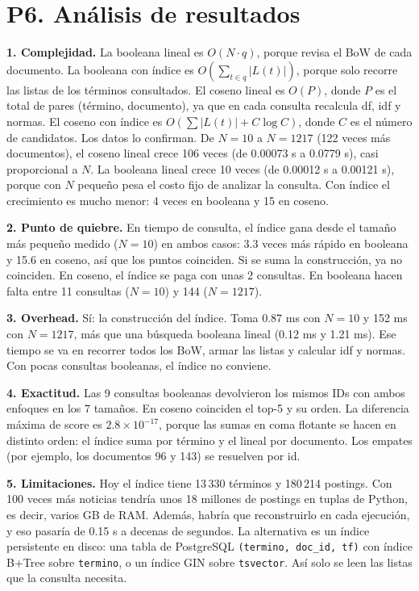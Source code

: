 \documentclass[11pt,a4paper]{article}
\newcommand{\code}[1]{\texttt{#1}}
\begin{document}
\section{P6. Análisis de resultados}
\textbf{1. Complejidad.} La booleana lineal es $O(N\cdot q)$, porque revisa el BoW de cada documento.
La booleana con índice es $O(\sum_{t\in q}|L(t)|)$, porque solo recorre las listas de los términos
consultados. El coseno lineal es $O(P)$, donde $P$ es el total de pares (término, documento), ya que en
cada consulta recalcula df, idf y normas. El coseno con índice es $O(\sum|L(t)| + C\log C)$, donde $C$
es el número de candidatos. Los datos lo confirman. De $N=10$ a $N=1217$ (122 veces más documentos),
el coseno lineal crece 106 veces (de 0.00073 s a 0.0779 s), casi proporcional a $N$. La booleana
lineal crece 10 veces (de 0.00012 s a 0.00121 s), porque con $N$ pequeño pesa el costo fijo de
analizar la consulta. Con índice el crecimiento es mucho menor: 4 veces en booleana y 15 en coseno.

\textbf{2. Punto de quiebre.} En tiempo de consulta, el índice gana desde el tamaño más pequeño medido
($N=10$) en ambos casos: 3.3 veces más rápido en booleana y 15.6 en coseno, así que los puntos
coinciden. Si se suma la construcción, ya no coinciden. En coseno, el índice se paga con unas 2
consultas. En booleana hacen falta entre 11 consultas ($N=10$) y 144 ($N=1217$).

\textbf{3. Overhead.} Sí: la construcción del índice. Toma 0.87 ms con $N=10$ y 152 ms con
$N=1217$, más que una búsqueda booleana lineal (0.12 ms y 1.21 ms). Ese tiempo se va en recorrer
todos los BoW, armar las listas y calcular idf y normas. Con pocas consultas booleanas, el índice no
conviene.

\textbf{4. Exactitud.} Las 9 consultas booleanas devolvieron los mismos IDs con ambos enfoques en los 7
tamaños. En coseno coinciden el top-5 y su orden. La diferencia máxima de score es $2.8\times10^{-17}$,
porque las sumas en coma flotante se hacen en distinto orden: el índice suma por término y el lineal
por documento. Los empates (por ejemplo, los documentos 96 y 143) se resuelven por id.

\textbf{5. Limitaciones.} Hoy el índice tiene 13\,330 términos y 180\,214 postings. Con 100 veces más
noticias tendría unos 18 millones de postings en tuplas de Python, es decir, varios GB de RAM. Además,
habría que reconstruirlo en cada ejecución, y eso pasaría de 0.15 s a decenas de segundos. La
alternativa es un índice persistente en disco: una tabla de PostgreSQL \code{(termino, doc\_id, tf)}
con índice B+Tree sobre \code{termino}, o un índice GIN sobre \code{tsvector}. Así solo se leen las
listas que la consulta necesita.
\end{document}
